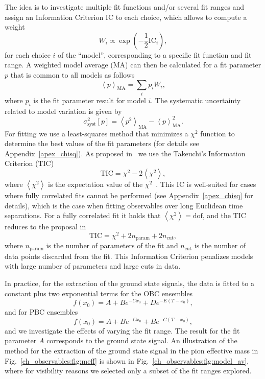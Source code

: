 The idea is to investigate multiple fit functions and/or several fit ranges and assign an Information Criterion ${\textrm{IC}}$ to each choice, which allows to compute a weight
\begin{equation}
\label{ch_observables:eq:weight}
W_i\propto\exp\left(-\frac{1}{2}{\textrm{IC}}_i\right),
\end{equation}
for each choice $i$ of the ``model'', corresponding to a specific fit function and fit range. A weighted model average (MA) can then be calculated for a fit parameter $p$ that is common to all models as follows
\begin{equation}
\left<{p}\right>_{\textrm{MA}}=\sum_i{p}_iW_i,
\end{equation}
where $p_i$ is the fit parameter result for model $i$. The systematic uncertainty related to model variation is given by
\begin{equation}
\label{ch_observables:eq:syst}
\sigma_{\textrm{syst}}^2[p]=\left<{p^2}\right>_{\textrm{MA}}-\left<p\right>^2_{\textrm{MA}}.
\end{equation}
For fitting we use a least-squares method that minimizes a $\chi^2$ function to determine the best values of the fit parameters (for details see Appendix~\ref{apex_chisq}). As proposed in~\citep{Frison:2023jbv} we use the Takeuchi's Information Criterion (TIC)
\begin{equation}
\label{ch_observables:eq:TIC}
{\textrm{TIC}}=\chi^2-2\left<\chi^2\right>,
\end{equation}
where $\left<\chi^2\right>$ is the expectation value of the $\chi^2$~\citep{Bruno:2022mfy}. This IC is well-suited for cases where fully correlated fits cannot be performed (see Appendix~\ref{apex_chisq} for details), which is the case when fitting observables over long Euclidean time separations. For a fully correlated fit it holds that $\left<\chi^2\right>={\textrm{dof}}$, and the TIC reduces to the proposal in~\citep{Neil:2022joj}
\begin{equation}
{\textrm{TIC}}=\chi^2+2n_{\textrm{param}}+2n_{\textrm{cut}},
\end{equation}
where $n_{\textrm{param}}$ is the number of parameters of the fit and $n_{\textrm{cut}}$ is the number of data points discarded from the fit. This Information Criterion penalizes models with large number of parameters and large cuts in data.

In practice, for the extraction of the ground state signals, the data is fitted to a constant plus two exponential terms for the OBC ensembles
\begin{equation}
\label{ch_observables:eq:fit}
f(x_0)=A+Be^{-Cx_0}+De^{-E(T-x_0)},
\end{equation}
and for PBC ensembles
\begin{equation}
f(x_0)=A+Be^{-Cx_0}+Be^{-C(T-x_0)},
\end{equation}
and we investigate the effects of varying the fit range. The result for the fit parameter $A$ corresponds to the ground state signal. An illustration of the method for the extraction of the ground state signal in the pion effective mass in Fig.~\ref{ch_observables:fig:meff} is shown in Fig.~\ref{ch_observables:fig:model_av}, where for visibility reasons we selected only a subset of the fit ranges explored.

